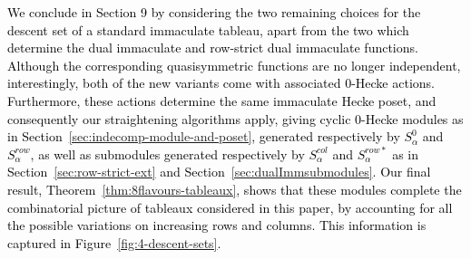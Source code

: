 \documentclass[12pt,letterpaper]{amsart}
\newcommand{\sheila}{\textcolor{black}}
\newcommand{\sheilaFeb}{\textcolor{black}}  \newcommand{\sheilaFebAgain}{\textcolor{magenta}}  \newcommand{\emn}{\textcolor{blue}}
\theoremstyle{definition}
\begin{document}
\sheila{We conclude in Section 9 by considering the two remaining choices for the descent set of a standard immaculate tableau, apart from the two which determine the dual immaculate and row-strict dual immaculate functions.  Although the corresponding quasisymmetric functions are no longer independent, interestingly, both of the new variants come with associated 0-Hecke actions.  Furthermore, these actions determine the same immaculate Hecke poset, and consequently our straightening algorithms apply, giving cyclic 0-Hecke modules as in Section~\ref{sec:indecomp-module-and-poset}, generated respectively by $S^0_\alpha$ and $S^{row}_\alpha$, as well as  submodules generated respectively by $S^{col}_\alpha$ and $S^{row*}_\alpha$ as in  Section~\ref{sec:row-strict-ext} and  Section~\ref{sec:dualImmsubmodules}.} \sheilaFeb{Our final result, Theorem~\ref{thm:8flavours-tableaux}, shows that these modules complete the combinatorial picture of  tableaux  considered in this paper, by accounting for all the possible variations on increasing rows and columns.  This information is captured in Figure~\ref{fig:4-descent-sets}. }
\end{document}
